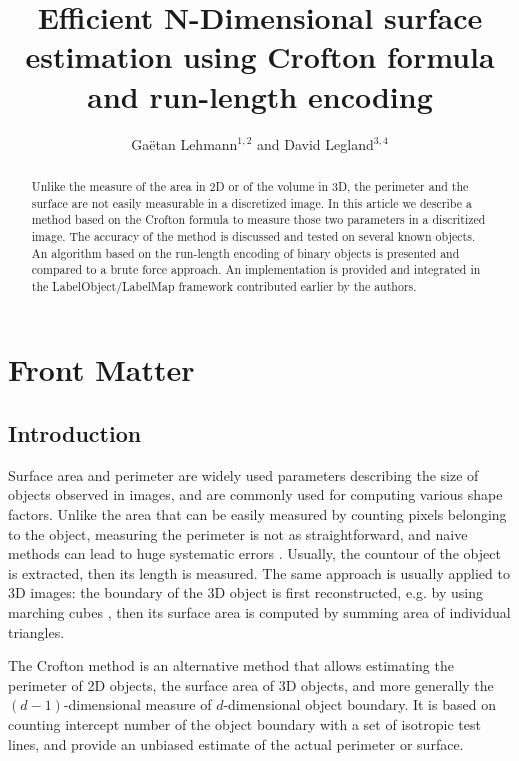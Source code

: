 \documentclass{InsightArticle}
\title{Efficient N-Dimensional surface estimation using Crofton formula and run-length encoding}
\author{Ga\"etan Lehmann$^{1,2}$ {\small{and}} David Legland$^{3,4}$}
\begin{document}
\maketitle

\ifhtml
\chapter*{Front Matter\label{front}}
\fi


\begin{abstract}
\noindent
Unlike the measure of the area in 2D or of the volume in 3D, the perimeter and the surface are not easily measurable in a discretized image.
In this article we describe a method based on the Crofton formula to measure those two parameters in a discritized image. The accuracy of
the method is discussed and tested on several known objects. An algorithm based on the run-length encoding of binary objects is presented
and compared to a brute force approach.
An implementation is provided and integrated in the LabelObject/LabelMap framework contributed earlier by the authors.
\end{abstract}

\tableofcontents

\section{Introduction}

Surface area and perimeter are widely used parameters describing the size of objects observed in images, 
and are commonly used for computing various shape factors.
Unlike the area that can be easily measured by counting pixels belonging to the object, measuring the 
perimeter is not as straightforward, 
and naive methods can lead to huge systematic errors \cite{Klette2004, Legland2007}.
Usually, the countour of the object is extracted, then its length is measured.
The same approach is usually applied to 3D images: the boundary of the 3D object is first reconstructed,
e.g. by using marching cubes \cite{Lorensen1987}, then its surface area is computed by summing 
area of individual triangles.

The Crofton method is an alternative method that allows estimating the perimeter of 2D objects,
the surface area of 3D objects, and more generally the $(d-1)$-dimensional measure of $d$-dimensional 
object boundary. 
It is based on counting intercept number of the object boundary with a set of isotropic test lines, 
and provide an unbiased estimate of the actual perimeter or surface.
\end{document}
